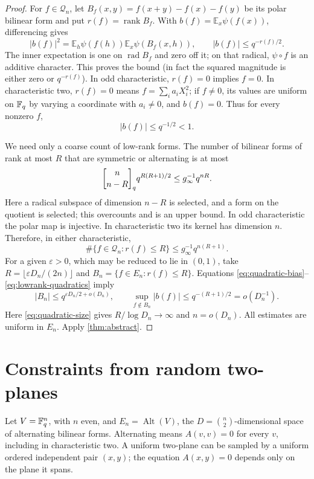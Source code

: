 \begin{proof}
For $f\in\mathcal Q_n$, let
$B_f(x,y)=f(x+y)-f(x)-f(y)$ be its polar bilinear form and put
$r(f)=\operatorname{rank}B_f$. With
$b(f)=\mathbb E_x\psi(f(x))$, differencing gives
\begin{equation}\label{eq:quadratic-bias}
 |b(f)|^2
 =\mathbb E_{h}\psi(f(h))\mathbb E_x\psi(B_f(x,h)),
 \qquad |b(f)|\le q^{-r(f)/2}.
\end{equation}
The inner expectation is one on $\operatorname{rad}B_f$ and zero off it;
on that radical, $\psi\circ f$ is an additive character. This proves the
bound (in fact the squared magnitude is either zero or $q^{-r(f)}$).
In odd characteristic, $r(f)=0$ implies $f=0$. In characteristic two,
$r(f)=0$ means $f=\sum_i a_iX_i^2$; if $f\ne0$, its values are uniform
on $\mathbb F_q$ by varying a coordinate with $a_i\ne0$, and $b(f)=0$.
Thus for every nonzero $f$,
\[
 |b(f)|\le q^{-1/2}<1.
\]

We need only a coarse count of low-rank forms. The number of bilinear
forms of rank at most $R$ that are symmetric or alternating is at most
\[
 \qbinom n{n-R}q^{R(R+1)/2}
 \le g_\infty^{-1}q^{nR}.
\]
Here a radical subspace of dimension $n-R$ is selected, and a form on
the quotient is selected; this overcounts and is an upper bound.
In odd characteristic the polar map is injective. In characteristic
two its kernel has dimension $n$. Therefore, in either characteristic,
\begin{equation}\label{eq:lowrank-quadratics}
 \#\{f\in\mathcal Q_n:r(f)\le R\}
 \le g_\infty^{-1}q^{n(R+1)}.
\end{equation}
For a given $\varepsilon>0$, which may be reduced to lie in $(0,1)$,
take $R=\lfloor\varepsilon D_n/(2n)\rfloor$ and
$B_n=\{f\in E_n:r(f)\le R\}$. Equations
\eqref{eq:quadratic-bias}--\eqref{eq:lowrank-quadratics} imply
\[
 |B_n|\le q^{\varepsilon D_n/2+o(D_n)},\qquad
 \sup_{f\notin B_n}|b(f)|\le q^{-(R+1)/2}=o(D_n^{-1}).
\]
Here \eqref{eq:quadratic-size} gives $R/\log D_n\to\infty$ and
$n=o(D_n)$. All estimates are uniform in $E_n$.
Apply \cref{thm:abstract}.
\end{proof}

\section{Constraints from random two-planes}\label{sec:planes}

Let $V=\mathbb F_q^n$, with $n$ even, and $E_n=\operatorname{Alt}(V)$, the
$D=\binom n2$-dimensional space of alternating bilinear forms. Alternating
means $A(v,v)=0$ for every $v$, including in characteristic two. A uniform
two-plane can be sampled by a uniform ordered independent pair $(x,y)$;
the equation $A(x,y)=0$ depends only on the plane it spans.

